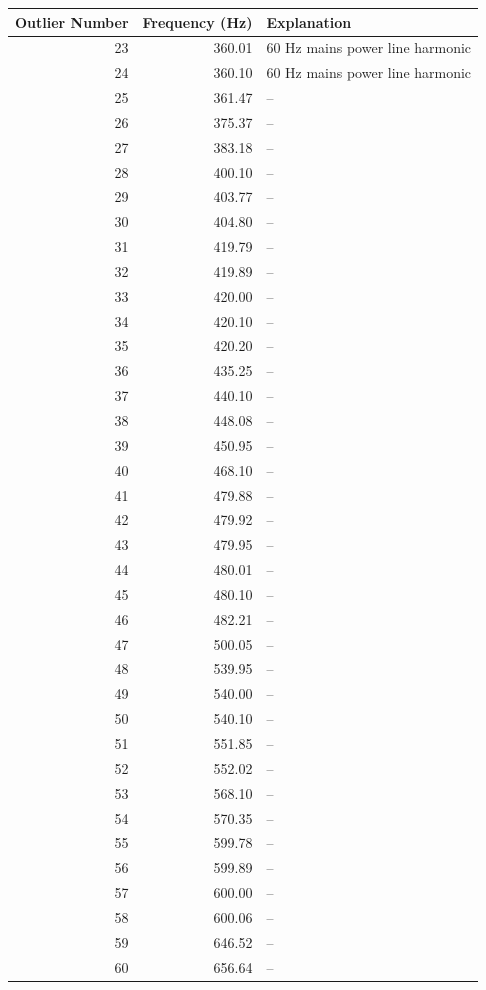 \begin{table}
\begin{center}
\begin{tabular}{r r l}
Outlier Number & Frequency (Hz) & Explanation \\
\hline
23 & 360.01  & 60 Hz mains power line harmonic \\
24 & 360.10 & 60 Hz mains power line harmonic \\
25 & 361.47 & -- \\
26 & 375.37 & -- \\
27 & 383.18 & -- \\
28 & 400.10 & -- \\
29 & 403.77 & -- \\
30 & 404.80 & -- \\
31 & 419.79 & -- \\
32 & 419.89 & -- \\
33 & 420.00 & -- \\
34 & 420.10 & -- \\
35 & 420.20 & -- \\
36 & 435.25 & -- \\
37 & 440.10 & -- \\
38 & 448.08 & -- \\
39 & 450.95 & -- \\
40 & 468.10 & -- \\
41 & 479.88 & -- \\
42 & 479.92 & -- \\
43 & 479.95 & -- \\
44 & 480.01 & -- \\
45 & 480.10 & -- \\
46 & 482.21 & -- \\
47 & 500.05 & -- \\
48 & 539.95 & -- \\
49 & 540.00 & -- \\
50 & 540.10 & -- \\
51 & 551.85 & -- \\
52 & 552.02 & -- \\
53 & 568.10 & -- \\
54 & 570.35 & -- \\
55 & 599.78 & -- \\
56 & 599.89 & -- \\
57 & 600.00 & -- \\
58 & 600.06 & -- \\
59 & 646.52 & -- \\
60 & 656.64 & -- \\

\end{tabular}
\end{center}
\end{table}

